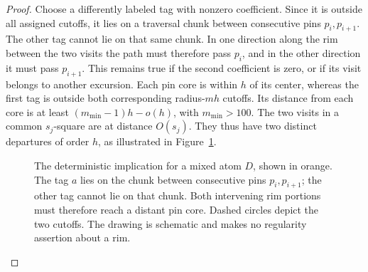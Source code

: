 \begin{proof}
Choose a differently labeled tag with nonzero coefficient.  Since
it is outside all assigned cutoffs, it lies on a traversal chunk
between consecutive pins $p_i,p_{i+1}$.  The other tag cannot lie on
that same chunk.  In one direction along the rim between the two
visits the path must therefore pass $p_i$, and in the other direction
it must pass $p_{i+1}$.  This remains true if the second coefficient
is zero, or if its visit belongs to another excursion.  Each pin
core is within $h$ of its center, whereas the first tag is outside
both corresponding radius-$mh$ cutoffs.  Its distance from each core
is at least $(m_{\min}-1)h-o(h)$, with $m_{\min}>100$.  The two
visits in a common $s_j$-square are at distance $O(s_j)$.  They thus
have two distinct departures of order $h$, as illustrated in
Figure~\ref{fig:mixed-atom}.

\begin{figure}[tb]
\centering
{}
\caption{The deterministic implication for a mixed atom $D$, shown in
orange.  The tag $a$
lies on the chunk between consecutive pins $p_i,p_{i+1}$; the other
tag cannot lie on that chunk.  Both intervening rim portions must
therefore reach a distant pin core.  Dashed circles depict the two
cutoffs.  The drawing is schematic and makes no regularity assertion
about a rim.}\label{fig:mixed-atom}
\end{figure}


\end{proof}
